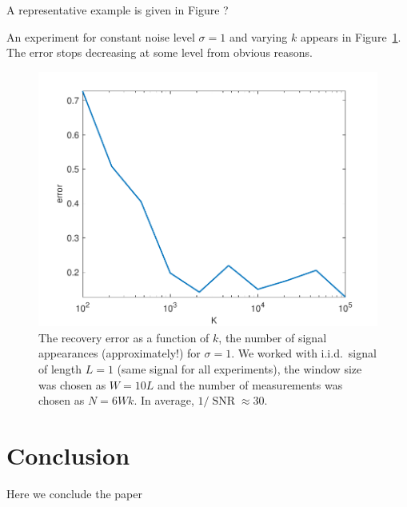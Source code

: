 \documentclass[journal]{IEEEtran}
\numberwithin{equation}{section}
\numberwithin{figure}{section}
\theoremstyle{plain}
\theoremstyle{definition}
\theoremstyle{remark}
\theoremstyle{plain}
\theoremstyle{remark}
\theoremstyle{plain}
\theoremstyle{plain}
\newcommand{\SNR}{\operatorname{SNR}}
\begin{document}
A representative example is given in Figure ?


An experiment for constant noise level $\sigma=1$ and varying $k$ appears in Figure~\ref{fig:varyingK}. The error stops decreasing at some level from obvious reasons.


\begin{figure}
	\centering
	\includegraphics[scale=0.5]{errXP1.pdf}
	\caption{\label{fig:varyingK}The recovery error as a function of $k$, the number of signal appearances (approximately!) for $\sigma=1$. We worked with i.i.d.\ signal of length $L=1$ (same signal for all experiments), the window size was chosen as $W=10L$ and the number of measurements was chosen as $N =6Wk $. In average, $1/\SNR\approx 30$.}
\end{figure}
\section{Conclusion} \label{sec:conclusion}
Here we conclude the paper





\end{document}
